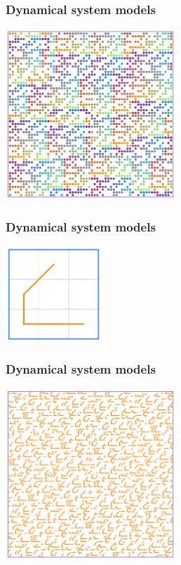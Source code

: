 \begin{frame}
  \frametitle{Dynamical system models}
  
  \begin{center}
   \includegraphics[height=64mm]{pic8.jpg}
  \end{center}
  
\end{frame}


\begin{frame}
  \frametitle{Dynamical system models}
  
  \begin{center}
   \includegraphics[height=36mm]{pic9.jpg}
  \end{center}
  
\end{frame}


\begin{frame}
  \frametitle{Dynamical system models}
  
  \begin{center}
   \includegraphics[height=64mm]{pic10.jpg}
  \end{center}
  
\end{frame}


